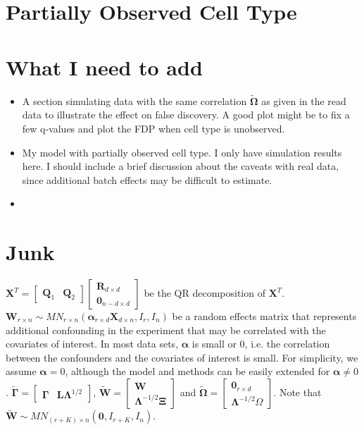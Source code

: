 \documentclass{article}
\begin{document}
\section{Partially Observed Cell Type}



\section{What I need to add}
\begin{itemize}
\item A section simulating data with the same correlation $\tilde{\bm{\Omega}}$ as given in the read data to illustrate the effect on false discovery. A good plot might be to fix a few q-values and plot the FDP when cell type is unobserved.
\item My model with partially observed cell type. I only have simulation results here. I should include a brief discussion about the caveats with real data, since additional batch effects may be difficult to estimate.
\item 
\end{itemize}


 

\section{Junk}
$\bm{X}^T = \left[ \begin{matrix}
\bm{Q}_1 & \bm{Q}_2
\end{matrix} \right]\left[ \begin{matrix}
\bm{R}_{d \times d}\\
\bm{0}_{n-d \times d}
\end{matrix} \right]$ be the QR decomposition of $\bm{X}^T$. $\bm{W}_{r \times n} \sim MN_{r \times n}\left( \bm{\alpha}_{r \times d}\bm{X}_{d \times n}, I_{r}, I_{n} \right)$ be a random effects matrix that represents additional confounding in the experiment that may be correlated with the covariates of interest. In most data sets, $\bm{\alpha}$ is small or 0, i.e. the correlation between the confounders and the covariates of interest is small. For simplicity, we assume $\bm{\alpha}=0$, although the model and methods can be easily extended for $\bm{\alpha} \neq 0$. $\bm{\tilde{\Gamma}} = \left[ \begin{matrix}
\bm{\Gamma} & \bm{L} \bm{\Lambda}^{1/2}
\end{matrix} \right]$, $\bm{\tilde{W}} = \left[ \begin{matrix}
\bm{W}\\
\bm{\Lambda}^{-1/2}\bm{\Xi}
\end{matrix} \right]$ and $\bm{\tilde{\Omega}} = \left[ \begin{matrix}
\bm{0}_{r \times d}\\
\bm{\Lambda}^{-1/2} \Omega
\end{matrix} \right]$. Note that $\bm{\tilde{W}} \sim MN_{\left( r+K \right)\times n}\left( \bm{0}, I_{r+K}, I_n \right)$.
\end{document}
